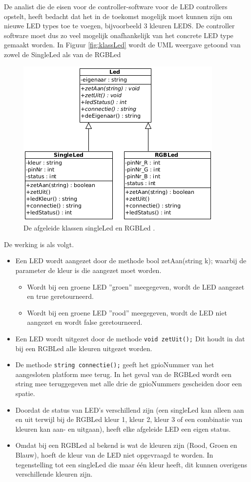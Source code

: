 De analist die de eisen voor de controller-software voor de LED controllers opstelt, heeft bedacht dat het in de toekomst mogelijk moet kunnen zijn om nieuwe LED types toe te voegen, bijvoorbeeld 3 kleuren LEDS. De controller software moet dus zo veel mogelijk onafhankelijk van het concrete LED type gemaakt worden. In Figuur \ref{fig:klassLed} wordt de UML weergave getoond van zowel de SingleLed als van de RGBLed
\begin{figure}[h!]
	\captionsetup{justification=centering}
	\includegraphics[width=0.6 \linewidth]{figuren/rgbKlasse}
	\centering
	\caption{De afgeleide klassen singleLed en RGBLed .}
	\label{fig:klasAfg}
\end{figure}
\newpage
De werking is als volgt.

\begin{itemize}
	\item Een LED wordt aangezet door de methode bool zetAan(string k); waarbij de parameter de kleur is die aangezet moet worden.
	\begin{itemize}
		\item Wordt bij een groene LED ''groen''  meegegeven, wordt de LED aangezet en true geretourneerd.
		\item Wordt bij een groene LED ''rood'' meegegeven, wordt de LED niet aangezet en wordt false geretourneerd.
	\end{itemize}
\item Een LED wordt uitgezet door de methode \texttt{void zetUit();} Dit houdt in dat bij een RGBLed alle kleuren uitgezet worden.
\item De methode \texttt{string connectie();} geeft het gpioNummer van het aangesloten platform mee terug. In het geval van de RGBLed wordt een string mee teruggegeven met alle drie de gpioNummers gescheiden door een spatie.
\item Doordat de status van LED's verschillend zijn (een singleLed kan alleen aan en uit terwijl bij de RGBLed kleur 1, kleur 2, kleur 3 of een combinatie van kleuren kan aan- en uitgaan), heeft elke afgeleide LED een eigen status.
\item Omdat bij een RGBLed al bekend is wat de kleuren zijn (Rood, Groen en Blauw), hoeft de kleur van de LED niet opgevraagd te worden. In tegenstelling tot een singleLed die maar \'{e}\'{e}n kleur heeft, dit kunnen overigens verschillende kleuren zijn.
\end{itemize}

